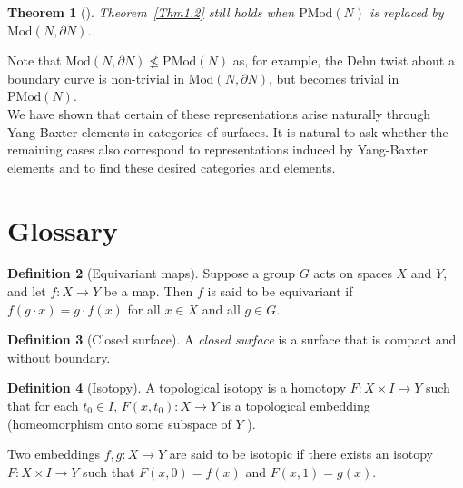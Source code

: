 \documentclass[reqno]{amsart}
\newtheorem{theorem}{Theorem}[section]
\theoremstyle{definition}
\newtheorem{definition}[theorem]{Definition}
\theoremstyle{remark}
\newcommand{\Mod}{{\mathrm{Mod}}}
\newcommand{\PMod}{{\mathrm{PMod}}}
\begin{document}
\begin{theorem}[]\label{Thm1.3}
    Theorem~\ref{Thm1.2} still holds
    when $\PMod (N)$ is replaced by $\Mod \left( N,
    \partial N \right) $.
\end{theorem}

Note that $\Mod (N, \partial N) \not \le 
\PMod (N)$ as, for example, the Dehn twist about a boundary
curve is non-trivial in $\Mod \left( N, \partial N \right) $, but
becomes trivial in $\PMod (N)$.\\
\linebreak
We have shown that certain of these representations
arise naturally through Yang-Baxter elements
in categories of surfaces. It is natural to ask
whether the remaining cases also
correspond to
representations induced by Yang-Baxter elements and to
find these desired categories and elements.



\newpage

\section{Glossary}

\begin{definition}[Equivariant maps]
    Suppose a group $G$ acts on spaces $X$ and $Y$, and let $f \colon X
    \to Y$ be a map. Then  $f$ is said to be equivariant if
    $f (g \cdot x) = g \cdot  f(x)$ for all $x \in X$ and all $g \in G$.
\end{definition}

\begin{definition}[Closed surface]
    A \textit{closed surface} is a surface that is compact
    and without boundary.
\end{definition}

\begin{definition}[Isotopy]
    A topological isotopy is a homotopy
    $F \colon X \times I \to Y$ such that for each $t_0 \in I$,
    $F(x,t_0) \colon X \to Y$ is a topological embedding (homeomorphism onto
    some subspace of $Y$ ).

    Two embeddings $f,g \colon X \to Y$ are said to be
    isotopic if there exists an isotopy $F \colon X \times I
    \to Y$ such that $F(x,0) = f(x)$ and $F(x,1) = g(x)$.
\end{definition}
\end{document}
